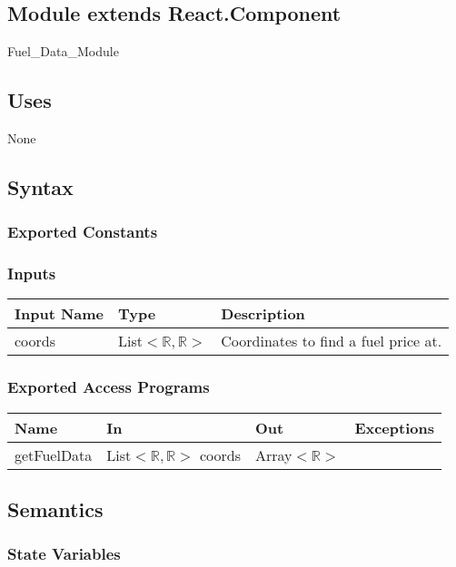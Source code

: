 \documentclass[12pt, titlepage]{article}
\begin{document}
\label{Module} 

\subsection{Module extends React.Component}

Fuel\_Data\_Module

\subsection{Uses}

None

\subsection{Syntax}

\subsubsection{Exported Constants}

\subsubsection{Inputs}
\begin{tabular}{| l | l | l |}
  \hline
  \textbf{Input Name} & \textbf{Type} & \textbf{Description}\\
  \hline
  coords & List$<\mathbb{R},\mathbb{R}>$  & Coordinates to find a fuel price at. \\
  \hline
\end{tabular}

\subsubsection{Exported Access Programs}

\begin{tabular}{| l | l | l | l |}
  \hline
  \textbf{Name} & \textbf{In} & \textbf{Out} & \textbf{Exceptions}\\
  \hline
  getFuelData & List$<\mathbb{R},\mathbb{R}>$ coords & Array$<\mathbb{R}>$ & ~\\
  \hline
\end{tabular}

\subsection{Semantics}

\subsubsection{State Variables}
\end{document}
